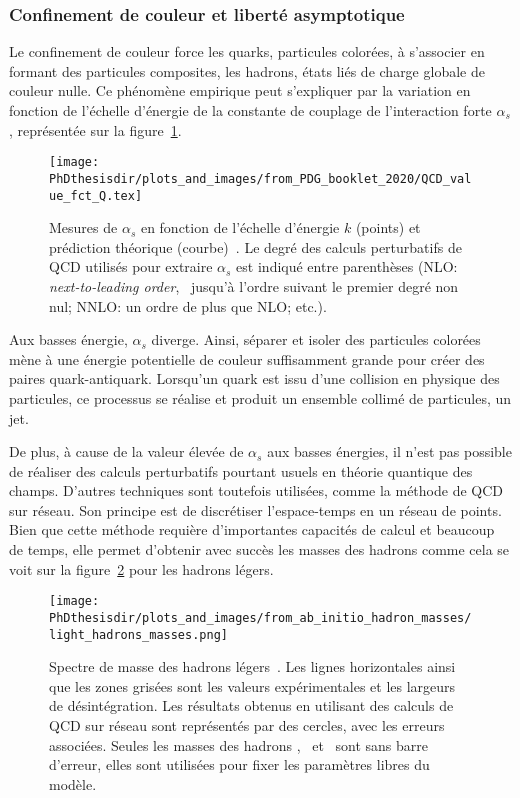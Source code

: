 \subsubsection{Confinement de couleur et liberté asymptotique}\label{chapter-MS-MSSM-section-formalisme-subsec-QCD-subsubsec-confinement}
Le confinement de couleur force les quarks, particules colorées, à s'associer en formant des particules composites, les hadrons, états liés de charge globale de couleur nulle. Ce phénomène empirique peut s'expliquer par la variation en fonction de l'échelle d'énergie de la constante de couplage de l'interaction forte $\alpha_s$, représentée sur la figure~\ref{fig-alpha_s_fct_energy}.
\begin{figure}[h]
\centering
\texttt{[image: \\PhDthesisdir/plots\_and\_images/from\_PDG\_booklet\_2020/QCD\_value\_fct\_Q.tex]}
\caption[Mesure de $\alpha_s$ en fonction de l'échelle d'énergie.]{Mesures de $\alpha_s$ en fonction de l'échelle d'énergie $k$ (points) et prédiction théorique (courbe)~\cite{PDG_booklet_2020}. Le degré des calculs perturbatifs de QCD utilisés pour extraire $\alpha_s$ est indiqué entre parenthèses (NLO: \emph{next-to-leading order}, \ie\ jusqu'à l'ordre suivant le premier degré non nul; NNLO: un ordre de plus que NLO; etc.).}
\label{fig-alpha_s_fct_energy}
\end{figure}
\par Aux basses énergie, $\alpha_s$ diverge.
Ainsi, séparer et isoler des particules colorées mène à une énergie potentielle de couleur suffisamment grande pour créer des paires quark-antiquark. Lorsqu'un quark est issu d'une collision en physique des particules, ce processus se réalise et produit un ensemble collimé de particules, un jet.
\par De plus, à cause de la valeur élevée de $\alpha_s$ aux basses énergies, il n'est pas possible de réaliser des calculs perturbatifs pourtant usuels en théorie quantique des champs.
D'autres techniques sont toutefois utilisées, comme la méthode de QCD sur réseau. Son principe est de discrétiser l'espace-temps en un réseau de points. Bien que cette méthode requière d'importantes capacités de calcul et beaucoup de temps, elle permet d'obtenir avec succès les masses des hadrons comme cela se voit sur la figure~\ref{fig-lattice_QCD_masses} pour les hadrons légers.
\begin{figure}[h]
\centering
\texttt{[image: \\PhDthesisdir/plots\_and\_images/from\_ab\_initio\_hadron\_masses/light\_hadrons\_masses.png]}
\caption[Spectre de masse des hadrons légers.]{Spectre de masse des hadrons légers~\cite{ab_initio_hadron_masses}. Les lignes horizontales ainsi que les zones grisées sont les valeurs expérimentales et les largeurs de désintégration. Les résultats obtenus en utilisant des calculs de QCD sur réseau sont représentés par des cercles, avec les erreurs associées. Seules les masses des hadrons \pion, \Kaon\ et \Xibaryon\ sont sans barre d'erreur, elles sont utilisées pour fixer les paramètres libres du modèle.}
\label{fig-lattice_QCD_masses}
\end{figure}
